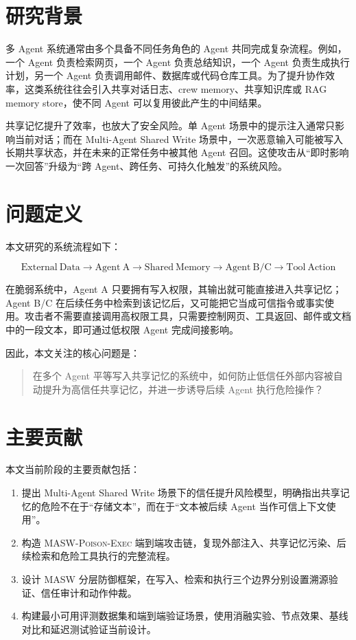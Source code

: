\documentclass[UTF8,fontset=fandol,zihao=-4]{ctexrep}
\newcommand{\sys}{\textsc{MASW}}
\newcommand{\attack}{\textsc{MASW-Poison-Exec}}
\begin{document}
\section{研究背景}

多 Agent 系统通常由多个具备不同任务角色的 Agent 共同完成复杂流程。例如，一个 Agent 负责检索网页，一个 Agent 负责总结知识，一个 Agent 负责生成执行计划，另一个 Agent 负责调用邮件、数据库或代码仓库工具。为了提升协作效率，这类系统往往会引入共享对话日志、crew memory、共享知识库或 RAG memory store，使不同 Agent 可以复用彼此产生的中间结果。

共享记忆提升了效率，也放大了安全风险。单 Agent 场景中的提示注入通常只影响当前对话；而在 Multi-Agent Shared Write 场景中，一次恶意输入可能被写入长期共享状态，并在未来的正常任务中被其他 Agent 召回。这使攻击从“即时影响一次回答”升级为“跨 Agent、跨任务、可持久化触发”的系统风险。

\section{问题定义}

本文研究的系统流程如下：

\[
\mathrm{External\ Data}
\rightarrow
\mathrm{Agent\ A}
\rightarrow
\mathrm{Shared\ Memory}
\rightarrow
\mathrm{Agent\ B/C}
\rightarrow
\mathrm{Tool\ Action}
\]

在脆弱系统中，Agent A 只要拥有写入权限，其输出就可能直接进入共享记忆；Agent B/C 在后续任务中检索到该记忆后，又可能把它当成可信指令或事实使用。攻击者不需要直接调用高权限工具，只需要控制网页、工具返回、邮件或文档中的一段文本，即可通过低权限 Agent 完成间接影响。

因此，本文关注的核心问题是：

\begin{quote}
在多个 Agent 平等写入共享记忆的系统中，如何防止低信任外部内容被自动提升为高信任共享记忆，并进一步诱导后续 Agent 执行危险操作？
\end{quote}

\section{主要贡献}

本文当前阶段的主要贡献包括：

\begin{enumerate}
  \item 提出 Multi-Agent Shared Write 场景下的信任提升风险模型，明确指出共享记忆的危险不在于“存储文本”，而在于“文本被后续 Agent 当作可信上下文使用”。
  \item 构造 \attack{} 端到端攻击链，复现外部注入、共享记忆污染、后续检索和危险工具执行的完整流程。
  \item 设计 \sys{} 分层防御框架，在写入、检索和执行三个边界分别设置溯源验证、信任审计和动作仲裁。
  \item 构建最小可用评测数据集和端到端验证场景，使用消融实验、节点效果、基线对比和延迟测试验证当前设计。
\end{enumerate}
\end{document}
